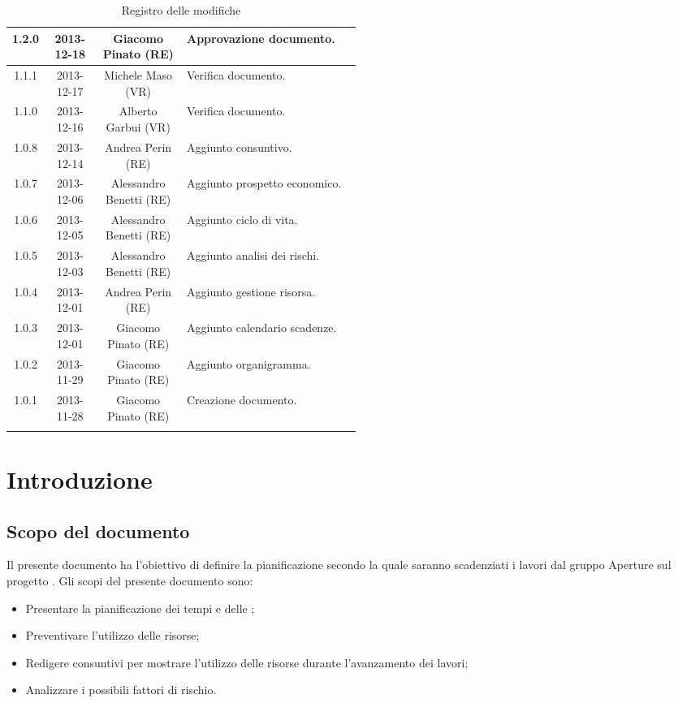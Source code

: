 \begin{center}
\begin{longtable}{|c|c|c|p{0.5\linewidth}|}
\midrule
1.2.0 & 2013-12-18 & Giacomo Pinato (RE) & Approvazione documento.\\
\midrule
1.1.1 & 2013-12-17 & Michele Maso (VR) & Verifica documento.\\
\midrule
1.1.0 & 2013-12-16 & Alberto Garbui (VR) & Verifica documento.\\
\midrule
1.0.8 & 2013-12-14 & Andrea Perin (RE) & Aggiunto consuntivo.\\
\midrule
1.0.7 & 2013-12-06 & Alessandro Benetti (RE) & Aggiunto prospetto economico.\\
\midrule
1.0.6 & 2013-12-05 & Alessandro Benetti (RE) & Aggiunto ciclo di vita.\\
\midrule
1.0.5 & 2013-12-03 & Alessandro Benetti (RE) & Aggiunto analisi dei rischi.\\
\midrule
1.0.4 & 2013-12-01 & Andrea Perin (RE) & Aggiunto gestione risorsa.\\
\midrule
1.0.3 & 2013-12-01 & Giacomo Pinato (RE) & Aggiunto calendario scadenze.\\
\midrule
1.0.2 & 2013-11-29 & Giacomo Pinato (RE) & Aggiunto organigramma.\\
\midrule
1.0.1 & 2013-11-28 & Giacomo Pinato (RE) & Creazione documento.\\

\bottomrule
\caption{Registro delle modifiche}
\label{tab:changelog}
\end{longtable}
\end{center}

\tableofcontents

\listoftables
\listoffigures



\newpage


\section{Introduzione}
\label{1.0}
\subsection{Scopo del documento}
\label{1.1}
Il presente documento ha l'obiettivo di definire la pianificazione secondo la quale saranno scadenziati i lavori dal gruppo Aperture  sul progetto \Progetto{}. Gli scopi del presente documento sono:
\begin{itemize}
\item Presentare la pianificazione dei tempi e delle ;
\item Preventivare l'utilizzo delle risorse;
\item Redigere consuntivi per mostrare l'utilizzo delle risorse durante l'avanzamento dei lavori;
\item Analizzare i possibili fattori di rischio.
\end{itemize}


